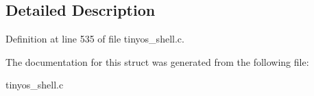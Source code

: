 \subsection{Detailed Description}


Definition at line 535 of file tinyos\-\_\-shell.\-c.



The documentation for this struct was generated from the following file\-:\begin{DoxyCompactItemize}
\item 
tinyos\-\_\-shell.\-c\end{DoxyCompactItemize}
